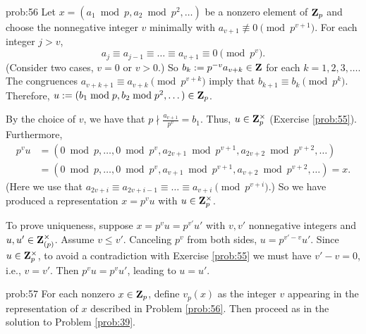 \begin{sol}{prob:56} Let $x = (a_1\bmod{p}, a_2\bmod{p^2}, \dots)$ be a nonzero element of $\mathbf{Z}_p$ and choose the nonnegative integer $v$ minimally with $a_{v+1}\not\equiv 0\pmod{p^{v+1}}$. 
For each integer $j > v$, 
\[ a_j \equiv a_{j-1} \equiv \dots \equiv a_{v+1} \equiv 0 \pmod{p^v}. \] 
(Consider two cases, $v=0$ or $v>0$.)  So  $b_k := p^{-v} a_{v+k} \in \mathbf{Z}$ for each $k=1,2,3,\dots$. The congruences $a_{v+k+1}\equiv a_{v+k} \pmod{p^{v+k}}$ imply that $b_{k+1}\equiv b_k\pmod{p^{k}}$. Therefore, $u:= (b_1\bmod{p}, b_2\bmod{p^2},\dots) \in \mathbf{Z}_{p}$. 

By the choice of $v$, we have that $p\nmid \frac{a_{v+1}}{p^v} = b_1$. Thus, $u \in \mathbf{Z}_{p}^\times$ (Exercise \ref{prob:55}). Furthermore,
\begin{align*} p^v u &= (0\bmod{p},\dots,0\bmod{p^v}, a_{2v+1}\bmod{p^{v+1}}, a_{2v+2}\bmod{p^{v+2}},\dots)\\
&= (0\bmod{p},\dots,0\bmod{p^v}, a_{v+1}\bmod{p^{v+1}}, a_{v+2}\bmod{p^{v+2}},\dots) = x.\end{align*} (Here we use that $a_{2v+i} \equiv a_{2v+i-1} \equiv \dots \equiv a_{v+i} \pmod{p^{v+i}}$.) So we have produced a representation $x=p^v u$ with $u \in \mathbf{Z}_{p}^\times$.

To prove uniqueness, suppose $x = p^{v} u = p^{v'} u'$ with $v, v'$ nonnegative integers and $u, u' \in \mathbf{Z}_{(p)}^{\times}$. Assume $v\le v'$. Canceling $p^{v}$ from both sides, $u = p^{v'-v} u'$. Since $u \in \mathbf{Z}_p^{\times}$, to avoid a contradiction with Exercise \ref{prob:55} we must have $v'-v=0$, i.e., $v=v'$. Then $p^v u = p^v u'$, leading to $u=u'$.
\end{sol}

\begin{sol}{prob:57} For each nonzero $x \in \mathbf{Z}_p$, define $v_p(x)$ as the integer $v$ appearing in the representation of $x$ described in Problem \ref{prob:56}. Then proceed as in the solution to Problem \ref{prob:39}. 
\end{sol}


